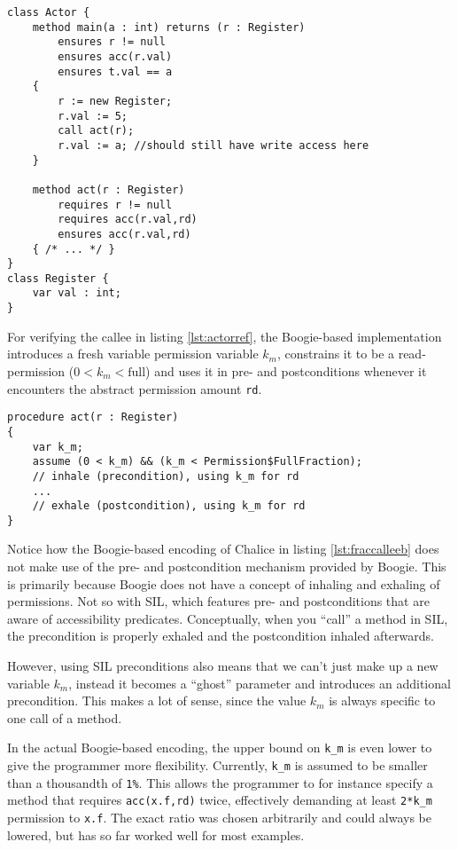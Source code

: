 \begin{lstlisting}[float,label=lst:actorref,caption={A call that uses and preserves fractional read permissions.},language=Chalice]
class Actor {
	method main(a : int) returns (r : Register)
		ensures r != null
		ensures acc(r.val)
		ensures t.val == a
	{
		r := new Register;
		r.val := 5;
		call act(r);
		r.val := a; //should still have write access here
	}

	method act(r : Register)
		requires r != null
		requires acc(r.val,rd)
		ensures acc(r.val,rd)
	{ /* ... */ }
}
class Register {
	var val : int;
}
\end{lstlisting}

For verifying the callee in listing \ref{lst:actorref}, the Boogie-based implementation introduces a fresh variable permission variable $k_m$, constrains it to be a read-permission ($0<k_m<\text{full}$) and uses it in pre- and postconditions whenever it encounters the abstract permission amount \lstinline!rd!. 

\begin{lstlisting}[float,caption={Handling of fractional read permissions by the Boogie-based Chalice verifier.},label=lst:fraccalleeb]
procedure act(r : Register)
{
	var k_m;
	assume (0 < k_m) && (k_m < Permission$FullFraction);
	// inhale (precondition), using k_m for rd
	...
	// exhale (postcondition), using k_m for rd
}
\end{lstlisting}

Notice how the Boogie-based encoding of Chalice in listing \ref{lst:fraccalleeb} does not make use of the pre- and postcondition mechanism provided by Boogie. 
This is primarily because Boogie does not have a concept of inhaling and exhaling of permissions. 
Not so with SIL, which features pre- and postconditions that are aware of accessibility predicates. 
Conceptually, when you ``call'' a method in SIL, the precondition is properly exhaled and the postcondition inhaled afterwards.

However, using SIL preconditions also means that we can't just make up a new variable $k_m$, instead it becomes a ``ghost'' parameter and introduces an additional precondition. This makes a lot of sense, since the value $k_m$ is always specific to one call of a method.

In the actual Boogie-based encoding, the upper bound on \lstinline!k_m! is even lower to give the programmer more flexibility. 
Currently, \lstinline!k_m! is assumed to be smaller than a thousandth of \lstinline[language=Chalice]!1%!.
This allows the programmer to for instance specify a method that requires \lstinline[language=Chalice]!acc(x.f,rd)! twice, effectively demanding at least \lstinline!2*k_m! permission to \lstinline!x.f!.
The exact ratio was chosen arbitrarily and could always be lowered, but has so far worked well for most examples.

